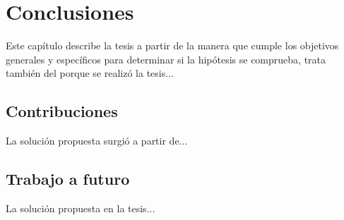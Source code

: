 \chapter{Conclusiones}
Este capítulo describe la tesis a partir de la manera que cumple los objetivos generales y específicos para determinar si la hipótesis se comprueba, trata también del porque se realizó la tesis...

\clearpage

\section{Contribuciones}
La solución propuesta surgió a partir de...

\section{Trabajo a futuro}
La solución propuesta en la tesis...